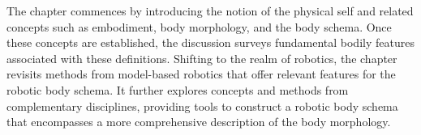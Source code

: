 The chapter commences by introducing the notion of the physical self and related concepts such as embodiment, body morphology, and the body schema. Once these concepts are established, the discussion surveys fundamental bodily features associated with these definitions. Shifting to the realm of robotics, the chapter revisits methods from model-based robotics that offer relevant features for the robotic body schema. It further explores concepts and methods from complementary disciplines, providing tools to construct a robotic body schema that encompasses a more comprehensive description of the body morphology.
%
%



